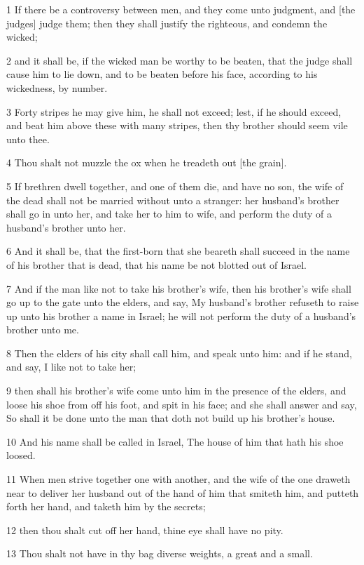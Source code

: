 \par 1 If there be a controversy between men, and they come unto judgment, and [the judges] judge them; then they shall justify the righteous, and condemn the wicked;
\par 2 and it shall be, if the wicked man be worthy to be beaten, that the judge shall cause him to lie down, and to be beaten before his face, according to his wickedness, by number.
\par 3 Forty stripes he may give him, he shall not exceed; lest, if he should exceed, and beat him above these with many stripes, then thy brother should seem vile unto thee.
\par 4 Thou shalt not muzzle the ox when he treadeth out [the grain].
\par 5 If brethren dwell together, and one of them die, and have no son, the wife of the dead shall not be married without unto a stranger: her husband's brother shall go in unto her, and take her to him to wife, and perform the duty of a husband's brother unto her.
\par 6 And it shall be, that the first-born that she beareth shall succeed in the name of his brother that is dead, that his name be not blotted out of Israel.
\par 7 And if the man like not to take his brother's wife, then his brother's wife shall go up to the gate unto the elders, and say, My husband's brother refuseth to raise up unto his brother a name in Israel; he will not perform the duty of a husband's brother unto me.
\par 8 Then the elders of his city shall call him, and speak unto him: and if he stand, and say, I like not to take her;
\par 9 then shall his brother's wife come unto him in the presence of the elders, and loose his shoe from off his foot, and spit in his face; and she shall answer and say, So shall it be done unto the man that doth not build up his brother's house.
\par 10 And his name shall be called in Israel, The house of him that hath his shoe loosed.
\par 11 When men strive together one with another, and the wife of the one draweth near to deliver her husband out of the hand of him that smiteth him, and putteth forth her hand, and taketh him by the secrets;
\par 12 then thou shalt cut off her hand, thine eye shall have no pity.
\par 13 Thou shalt not have in thy bag diverse weights, a great and a small.
